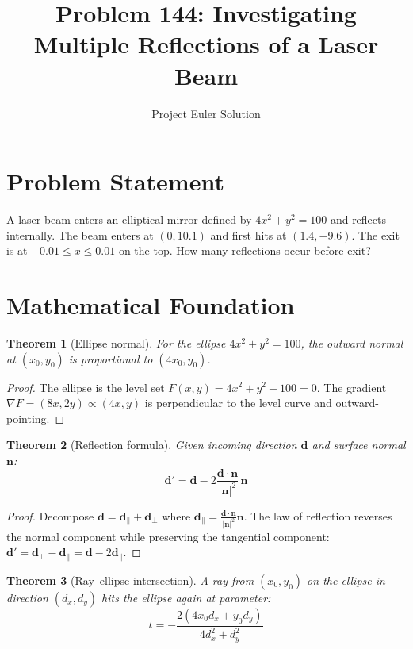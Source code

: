 \documentclass[12pt]{article}
\title{Problem 144: Investigating Multiple Reflections of a Laser Beam}
\author{Project Euler Solution}
\date{}
\newtheorem{theorem}{Theorem}
\begin{document}
\maketitle

\section{Problem Statement}
A laser beam enters an elliptical mirror defined by $4x^2 + y^2 = 100$ and reflects internally. The beam enters at $(0, 10.1)$ and first hits at $(1.4, -9.6)$. The exit is at $-0.01 \le x \le 0.01$ on the top. How many reflections occur before exit?

\section{Mathematical Foundation}

\begin{theorem}[Ellipse normal]
For the ellipse $4x^2 + y^2 = 100$, the outward normal at $(x_0, y_0)$ is proportional to $(4x_0, y_0)$.
\end{theorem}

\begin{proof}
The ellipse is the level set $F(x,y) = 4x^2 + y^2 - 100 = 0$. The gradient $\nabla F = (8x, 2y) \propto (4x, y)$ is perpendicular to the level curve and outward-pointing.
\end{proof}

\begin{theorem}[Reflection formula]
Given incoming direction $\mathbf{d}$ and surface normal $\mathbf{n}$:
\[
\mathbf{d}' = \mathbf{d} - 2\frac{\mathbf{d} \cdot \mathbf{n}}{|\mathbf{n}|^2}\,\mathbf{n}
\]
\end{theorem}

\begin{proof}
Decompose $\mathbf{d} = \mathbf{d}_\parallel + \mathbf{d}_\perp$ where $\mathbf{d}_\parallel = \frac{\mathbf{d} \cdot \mathbf{n}}{|\mathbf{n}|^2}\mathbf{n}$. The law of reflection reverses the normal component while preserving the tangential component: $\mathbf{d}' = \mathbf{d}_\perp - \mathbf{d}_\parallel = \mathbf{d} - 2\mathbf{d}_\parallel$.
\end{proof}

\begin{theorem}[Ray--ellipse intersection]
A ray from $(x_0, y_0)$ on the ellipse in direction $(d_x, d_y)$ hits the ellipse again at parameter:
\[
t = -\frac{2(4x_0 d_x + y_0 d_y)}{4d_x^2 + d_y^2}
\]
\end{theorem}
\end{document}
